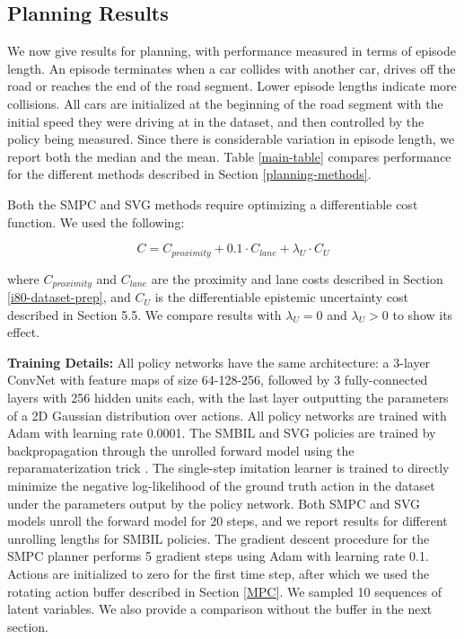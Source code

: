 \documentclass{article} %
\begin{document}
    \subsection{Planning Results}

    We now give results for planning, with performance measured in terms of episode length. An episode terminates when a car collides with another car, drives off the road or reaches the end of the road segment. Lower episode lengths indicate more collisions. All cars are initialized at the beginning of the road segment with the initial speed they were driving at in the dataset, and then controlled by the policy being measured. Since there is considerable variation in episode length, we report both the median and the mean. Table \ref{main-table} compares performance for the different methods described in Section \ref{planning-methods}.

    Both the SMPC and SVG methods require optimizing a differentiable cost function. We used the following:

    \begin{equation}
      C = C_{proximity} + 0.1 \cdot C_{lane} + \lambda_U \cdot C_U
    \end{equation}

    where $C_{proximity}$ and $C_{lane}$ are the proximity and lane costs described in Section \ref{i80-dataset-prep}, and $C_U$ is the differentiable epistemic uncertainty cost described in Section 5.5. We compare results with $\lambda_U = 0$ and $\lambda_U > 0$ to show its effect.

    \textbf{Training Details:} All policy networks have the same architecture: a 3-layer ConvNet with feature maps of size 64-128-256, followed by 3 fully-connected layers with 256 hidden units each, with the last layer outputting the parameters of a 2D Gaussian distribution over actions. All policy networks are trained with Adam with learning rate 0.0001. The SMBIL and SVG policies are trained by backpropagation through the unrolled forward model using the reparamaterization trick \citep{VAE}. The single-step imitation learner is trained to directly minimize the negative log-likelihood of the ground truth action in the dataset under the parameters output by the policy network. Both SMPC and SVG models unroll the forward model for 20 steps, and we report results for different unrolling lengths for SMBIL policies.
    The gradient descent procedure for the SMPC planner performs 5 gradient steps using Adam with learning rate 0.1. Actions are initialized to zero for the first time step, after which we used the rotating action buffer described in Section \ref{MPC}. We sampled 10 sequences of latent variables. We also provide a comparison without the buffer in the next section.
\end{document}
